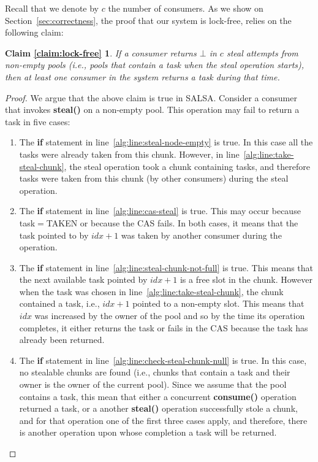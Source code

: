 Recall that we denote by $c$ the number of consumers.
As we show on Section~\ref{sec:correctness}, the proof that our system is lock-free, relies on the following claim:

\newtheorem*{claim:lock-free}{Claim \ref{claim:lock-free}}
\begin{claim:lock-free}
If a consumer returns $\bot$ in $c$ steal attempts from non-empty pools (i.e., pools that contain a task when the steal operation starts), then at least one consumer in the system returns a task during that time. 
\end{claim:lock-free}
\begin{proof}
We argue that the above claim is true in SALSA. Consider a consumer that invokes {\bf steal()} on a non-empty pool. This operation may fail to return a task in five cases:
\begin{enumerate}
 \item The {\bf if} statement in line~\ref{alg:line:steal-node-empty} is true. In this case all the tasks were already taken from this chunk. However, in line~\ref{alg:line:take-steal-chunk}, the steal operation took a chunk containing tasks, and therefore tasks were taken from this chunk (by other consumers) during the steal operation.
 \item The {\bf if} statement in line~\ref{alg:line:cas-steal} is true. This may occur because task$=$TAKEN or because the CAS fails. In both cases, it means that the task pointed to by $idx+1$ was taken by another consumer during the operation.
 \item The {\bf if} statement in line~\ref{alg:line:steal-chunk-not-full} is true. This means that the next available task pointed by $idx+1$ is a free slot in the chunk. However when the task was chosen in line~\ref{alg:line:take-steal-chunk}, the chunk contained a task, i.e., $idx+1$ pointed to a non-empty slot. This means that $idx$ was increased by the owner of the pool and so by the time its operation completes, it either returns the task or fails in the CAS because the task has already been returned.
 \item The {\bf if} statement in line~\ref{alg:line:check-steal-chunk-null} is true. In this case, no stealable chunks are found (i.e., chunks that contain a task and their owner is the owner of the current pool). Since we assume that the pool contains a task, this mean that either a concurrent {\bf consume()} operation returned a task, or a another {\bf steal()} operation successfully stole a chunk, and for that operation one of the first three cases apply, and therefore, there is another operation upon whose completion a task will be returned.

\end{enumerate}
\end{proof}
